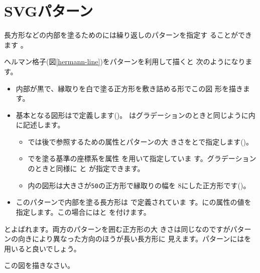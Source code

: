 \section{SVGパターン}
長方形などの内部を塗るためのには繰り返しのパターンを指定す
ることができます
\iffalse\footnote{\FF はSVGパターンをサポートしていません。}\fi 。


ヘルマン格子(図\ref{hermann-line})をパターンを利用して描くと
次のようになります。
{}
\begin{itemize}
 \item 内部が黒で、縁取りを白で塗る正方形を敷き詰める形でこの図
       形を描きます。
 \item 基本となる図形はで定義します()。
        はグラデーションのときと同じように内
	に記述します。
 \begin{itemize}
  \item {}では後で参照するための属性とパターンの大
	きさをとで指定します()。
  \item {}でを塗る基準の座標系を属性
	を用いて指定していま
	す。グラデーションのときと同様に
	と
	が指定できます。
  \item {}内の図形は大きさが\texttt{50}の正方形で縁取りの幅を
	$8$にした正方形です()。
 \end{itemize}
 \item このパターンで内部を塗る長方形は
       で定義されていま
       す。にの属性の値を
       指定します。この場合にはと
       を付けます。
\end{itemize}
{\cite[132ページ]{Ninio}とよばれます。両方のパターンを囲む正方形の大
きさは同じなのですがパターンの向きにより異なった方向のほうが長い長方形に
見えます。パターンにはを用いると良いでしょう。\par
この図を描きなさい。}

